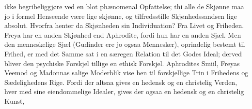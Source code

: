 \documentclass[12pt]{book}
\newcommand{\opage}[1]{\marginnote{\footnotesize\textit{[#1]}}}
\begin{document}
\opage{267} ikke begribeliggjøre ved en blot phænomenal Opfattelse; thi alle de Skjønne maa jo i
formel Henseende være lige skjønne, og tilfredsstille Skjønhedssandsen lige absolut.
Hvorfra henter da Skjønheden sin Individuation? Fra Livet og Friheden. Freya har en
anden Skjønhed end Aphrodite, fordi hun har en anden Sjæl. Men den menneskelige Sjæl
(Gudinder ere jo ogsaa Mennesker), oprindelig bestemt til Frihed, er med det Samme
sat i en særegen Relation til det Godes Ideal; derved bliver den psychiske Forskjel
tillige en ethisk Forskjel. Aphrodites Smiil, Freyas Veemod og Madonnas salige
Moderblik vise hen til forskjellige Trin i Frihedens og Sædelighedens Rige. Fordi
der altsaa gives en hedensk og en christelig Verden, hver med sine eiendommelige
Idealer, gives der ogsaa en hedensk og en christelig Kunst,
\end{document}

